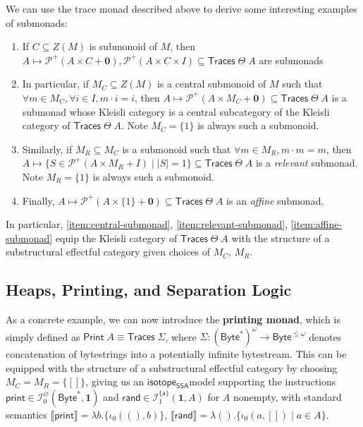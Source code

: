 \documentclass[acmsmall,screen,review]{acmart}
\newcommand{\mc}[1]{\ensuremath{\mathcal{#1}}}
\newcommand{\mb}[1]{\ensuremath{\mathbf{#1}}}
\newcommand{\ms}[1]{\ensuremath{\mathsf{#1}}}
\newcommand{\taff}{{\{\ms{a}\}}}
\newcommand{\dnt}[1]{\llbracket{#1}\rrbracket}
\newcommand{\isotopessa}{\ms{isotope_{SSA}}}
\begin{document}
We can use the trace monad described above to derive some interesting examples
of submonads:
\begin{enumerate}
  \item If \(C \subseteq Z(M)\) is submonoid of \(M\), then \(A \mapsto
  \mc{P}^+(A \times C + \mb{0}), \mc{P}^+(A \times C \times I) \subseteq
  \ms{Traces}\;\Theta\;A\) are submonads
  \item In particular, if \(M_C \subseteq Z(M)\) is a central submonoid of \(M\)
  such that \(\forall m \in M_C, \forall i \in I, m \cdot i = i\), then \(A
  \mapsto \mc{P}^+(A \times M_C + \mb{0}) \subseteq \ms{Traces}\;\Theta\;A\) is
  a submonad whose Kleisli category is a central subcategory of the Kleisli
  category of \(\ms{Traces}\;\Theta\;A\). Note \(M_C = \{1\}\) is always such a
  submonoid.
  \label{item:central-submonad}
  \item Similarly, if \(M_R \subseteq M_C\) is a submonoid such that \(\forall m
  \in M_R, m \cdot m = m\), then \(A \mapsto \{S \in \mc{P}^+(A \times M_R + I)
  \mid |S| = 1\} \subseteq \ms{Traces}\;\Theta\;A\) is a \textit{relevant}
  submonad. Note \(M_R = \{1\}\) is always such a submonoid.
  \label{item:relevant-submonad}
  \item Finally, \(A \mapsto \mc{P}^+(A \times \{1\} + \mb{0}) \subseteq
  \ms{Traces}\;\Theta\;A\) is an \textit{affine} submonad.
  \label{item:affine-submonad}
\end{enumerate}
In particular, \ref{item:central-submonad}, \ref{item:relevant-submonad},
\ref{item:affine-submonad} equip the Kleisli category of
\(\ms{Traces}\;\Theta\;A\) with the structure of a substructural effectful
category given choices of \(M_C\), \(M_R\).

\subsection{Heaps, Printing, and Separation Logic}

\label{ssec:separation}

As a concrete example, we can now introduce the \textbf{printing monad}, which
is simply defined as \(\ms{Print}\;A \equiv \ms{Traces}\;\Sigma\), where
\(\Sigma: (\ms{Byte}^*)^\omega \to \ms{Byte}^{\leq \omega}\) denotes
concatenation of bytestrings into a potentially infinite bytestream. This can be
equipped with the structure of a substructural effectful category by choosing
\(M_C = M_R = \{[]\}\), giving us an \isotopessa model supporting the
instructions \(\ms{print} \in \mc{I}^\varnothing_0(\ms{Byte}^*, \mb{1})\) and
\(\ms{rand} \in \mc{I}^\taff_1(\mb{1}, A)\) for \(A\) nonempty, with standard
semantics \(\dnt{\ms{print}} = \lambda b.\{\iota_0 ((), b)\}\),
\(\dnt{\ms{rand}} = \lambda (). \{\iota_0 (a, []) \mid a \in A\}\).
\end{document}

